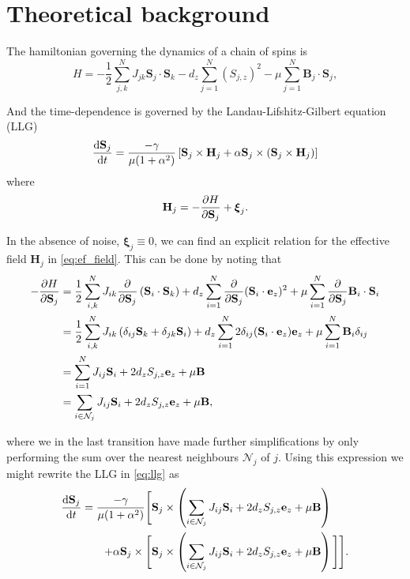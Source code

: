 \section{Theoretical background}

The hamiltonian governing the dynamics of a chain of spins is
\begin{equation}\label{eq:hamiltionian}
	H = - \frac{1}{2} \sum_{j,k}^{N} J_{jk} \mathbf{S}_j \cdot \mathbf{S}_k - d_z \sum_{j=1}^{N} (S_{j,z})^2 - \mu \sum_{j=1}^{N} \mathbf{B}_j \cdot \mathbf{S}_j,
\end{equation}

And the time-dependence is governed by the Landau-Lifshitz-Gilbert equation (LLG) 
\begin{equation}\label{eq:llg}
	\frac{\text{d} \mathbf{S}_j}{\text{d} t} = \frac{-\gamma}{\mu(1 + \alpha^2)} \left[ \mathbf{S}_j \times \mathbf{H}_j + \alpha \mathbf{S}_j \times (\mathbf{S}_j \times \mathbf{H}_j) \right]
\end{equation}
where
\begin{equation}\label{eq:ef_field}
	\mathbf{H}_j = -\frac{\partial H}{\partial \mathbf{S}_j} + \boldsymbol{\xi}_j.
\end{equation}

In the absence of noise, $\boldsymbol{\xi}_j \equiv 0$, we can find an explicit relation for the effective field $\mathbf{H}_j$ in \eqref{eq:ef_field}. This can be done by noting that 
\begin{align*}
	-\frac{\partial H}{\partial \mathbf{S}_j} &= \frac{1}{2}\sum_{i,k}^{N} J_{ik} \frac{\partial}{\partial \mathbf{S}_j} \left( \mathbf{S}_i \cdot \mathbf{S}_k \right) + d_z \sum_{i=1}^{N} \frac{\partial }{\partial \mathbf{S}_j}(\mathbf{S}_i \cdot \mathbf{e}_z)^2 + \mu \sum_{i=1}^{N} \frac{\partial }{\partial \mathbf{S}_j} \mathbf{B}_i \cdot \mathbf{S}_i \\
	&= \frac{1}{2}\sum_{i,k}^{N} J_{ik} \left( \delta_{ij} \mathbf{S}_k + \delta_{jk} \mathbf{S}_i \right) + d_z \sum_{i=1}^N 2 \delta_{ij} (\mathbf{S}_i \cdot \mathbf{e}_z) \mathbf{e}_z + \mu \sum_{i=1}^N \mathbf{B}_i \delta_{ij} \\
	&= \sum_{i=1}^N J_{ij} \mathbf{S}_i + 2d_z S_{j,z} \mathbf{e}_z + \mu \mathbf{B} \\
	&= \sum_{i \in \mathcal{N}_j} J_{ij} \mathbf{S}_i + 2d_z S_{j,z} \mathbf{e}_z + \mu \mathbf{B}, 
\end{align*}

where we in the last transition have made further simplifications by only performing the sum over the nearest neighbours $\mathcal{N}_j$ of $j$. Using this expression we might rewrite the LLG in \eqref{eq:llg} as
\begin{align*}\label{eq:llg_simplified}
	\frac{\text{d} \mathbf{S}_j}{\text{d} t} = \frac{-\gamma}{\mu(1 + \alpha^2)} \Bigg[ \mathbf{S}_j &\times \left( \sum_{i \in \mathcal{N}_j} J_{ij} \mathbf{S}_i + 2d_z S_{j,z} \mathbf{e}_z + \mu \mathbf{B} \right) \\
	+ \alpha \mathbf{S}_j \times \Bigg[  \mathbf{S}_j  &\times \left( \sum_{i \in \mathcal{N}_j} J_{ij} \mathbf{S}_i + 2d_z S_{j,z} \mathbf{e}_z + \mu \mathbf{B} \right) \Bigg] \Bigg].
\end{align*}